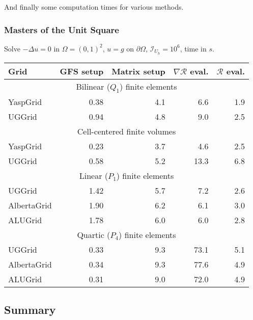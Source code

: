 And finally some computation times for various methods.

\begin{frame}
\frametitle<presentation>{Masters of the Unit Square}
Solve $-\Delta u = 0$ in $\Omega=(0,1)^2$, $u=g$ on $\partial\Omega$, $\mathcal{I}_{U_h}=10^6$, time in $s$.

\vspace{-4mm}
\begin{center} \small
\begin{tabular}{|l||r|r|r|r|}
\hline
Grid & GFS setup & Matrix setup & $\nabla\mathcal{R}$ eval. & $\mathcal{R}$ eval.\\
\hline
\multicolumn{5}{|c|}{Bilinear ($Q_1$) finite elements}\\
\hline
YaspGrid & 0.38 & 4.1 & 6.6 & 1.9 \\
UGGrid   & 0.94 & 4.8 & 9.0 & 2.5 \\
\hline
\multicolumn{5}{|c|}{Cell-centered finite volumes}\\
\hline
YaspGrid & 0.23 & 3.7 & 4.6 & 2.5 \\
UGGrid   & 0.58 & 5.2 &13.3 & 6.8 \\
\hline
\multicolumn{5}{|c|}{Linear ($P_1$) finite elements}\\
\hline
UGGrid      & 1.42 & 5.7 & 7.2 & 2.6 \\
AlbertaGrid & 1.90 & 6.2 & 6.1 & 3.0 \\
ALUGrid     & 1.78 & 6.0 & 6.0 & 2.8 \\
\hline
\multicolumn{5}{|c|}{Quartic ($P_4$) finite elements}\\
\hline
UGGrid      & 0.33 & 9.3 & 73.1 & 5.1 \\
AlbertaGrid & 0.34 & 9.3 & 77.6 & 4.9 \\
ALUGrid     & 0.31 & 9.0 & 72.0 & 4.9 \\
\hline
\end{tabular}
\end{center}

\end{frame}


\subsection{Summary}

